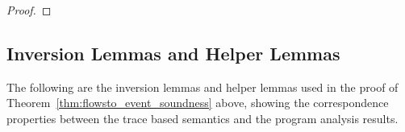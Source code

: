 \begin{proof}
%
\end{proof}

\subsection{Inversion Lemmas and Helper Lemmas}
The following are the inversion lemmas and helper lemmas used in the proof of Theorem~\ref{thm:flowsto_event_soundness} above,
showing the correspondence properties between the trace based semantics and the program analysis results.
